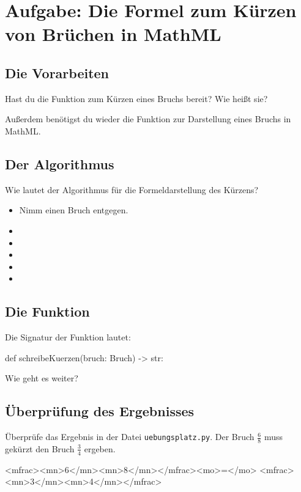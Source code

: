 \section{Aufgabe: Die Formel zum Kürzen von Brüchen in MathML}

\subsection*{Die Vorarbeiten}

Hast du die Funktion zum Kürzen eines Bruchs bereit? Wie heißt sie?

Außerdem benötigst du wieder die Funktion zur Darstellung eines Bruchs in MathML.

\subsection*{Der Algorithmus}

Wie lautet der Algorithmus für die Formeldarstellung des Kürzens?

{\huge
	\begin{itemize}
		\item Nimm einen Bruch entgegen. 
		\item  
		\item  
		\item  
		\item  
		\item  
	\end{itemize}
}


\subsection*{Die Funktion}

Die Signatur der Funktion lautet:

\begin{codePython}
def schreibeKuerzen(bruch: Bruch) -> str:
\end{codePython}

Wie geht es weiter?

\subsection*{Überprüfung des Ergebnisses}

Überprüfe das Ergebnis in der Datei \texttt{uebungsplatz.py}. Der Bruch $\frac{6}{8}$ muss gekürzt den Bruch $\frac{3}{4}$ ergeben.

\begin{codeHTML}
<mfrac><mn>6</mn><mn>8</mn></mfrac><mo>=</mo>
	<mfrac><mn>3</mn><mn>4</mn></mfrac>
\end{codeHTML}

